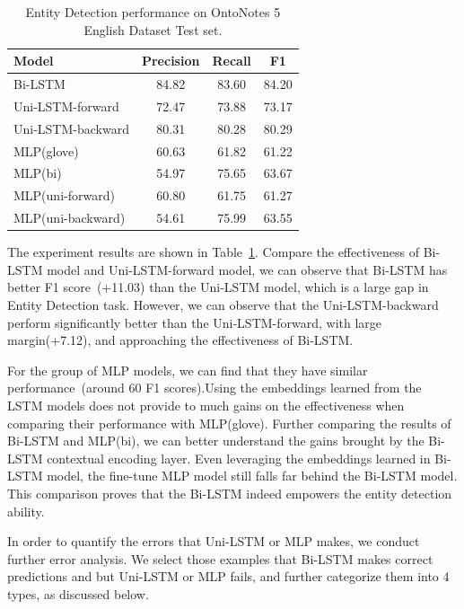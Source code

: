 \documentclass{article}
\begin{document}
\begin{table}[t]
	\centering
	\begin{tabular}{l@{\qquad}ccc}
		\toprule
		\textbf{Model}         & \textbf{Precision} & \textbf{Recall} & \textbf{F1} \\ \midrule
		Bi-LSTM &  84.82 & 83.60  & 84.20 \\
		Uni-LSTM-forward & 72.47 & 73.88 & 73.17 \\
		Uni-LSTM-backward & 80.31 & 80.28 & 80.29 \\ \midrule
		MLP(glove) & 60.63 & 61.82 & 61.22 \\
		MLP(bi) & 54.97 & 75.65 & 63.67 \\ 
		MLP(uni-forward) & 60.80 & 61.75 &  61.27 \\ 
		MLP(uni-backward) & 54.61 & 75.99 & 63.55 \\ 
		\bottomrule
	\end{tabular}
	\vspace{3mm}
	\caption{Entity Detection performance on OntoNotes 5 English Dataset Test set. }

	\label{res:ner}
\end{table}



The experiment results are shown in Table~\ref{res:ner}. Compare the effectiveness of Bi-LSTM model and Uni-LSTM-forward model, we can observe that Bi-LSTM has better F1 score~(+11.03) than the Uni-LSTM model, which is a large gap in Entity Detection task. However, we can observe that the Uni-LSTM-backward perform significantly better than the Uni-LSTM-forward, with large margin(+7.12), and approaching the effectiveness of Bi-LSTM.

For the group of MLP models, we can find that they have similar performance~(around 60 F1 scores).Using the embeddings learned from the LSTM models does not provide to much gains on the effectiveness when comparing their performance with MLP(glove). Further comparing the results of Bi-LSTM and MLP(bi), we can better understand the gains brought by the Bi-LSTM contextual encoding layer. Even leveraging the embeddings learned in Bi-LSTM model, the fine-tune MLP model still falls far behind the Bi-LSTM model. This comparison proves that the Bi-LSTM indeed empowers the entity detection ability. 

In order to quantify the errors that Uni-LSTM or MLP makes, we conduct further error analysis. We select those examples that Bi-LSTM makes correct predictions and but Uni-LSTM or MLP fails, and further categorize them into 4 types, as discussed below.
\end{document}
